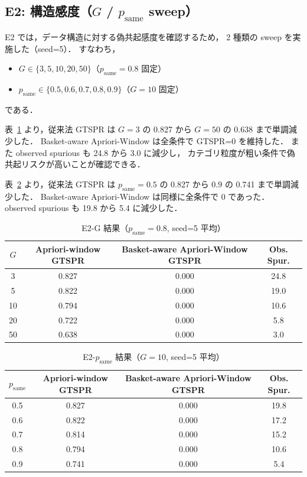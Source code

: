 \subsection{E2: 構造感度（$G$ / $p_{\text{same}}$ sweep）}
\label{sec:exp_e2}

E2 では，データ構造に対する偽共起感度を確認するため，
2 種類の sweep を実施した（seed=5）．
すなわち，
\begin{itemize}
    \item $G \in \{3,5,10,20,50\}$（$p_{\text{same}}=0.8$ 固定）
    \item $p_{\text{same}} \in \{0.5,0.6,0.7,0.8,0.9\}$（$G=10$ 固定）
\end{itemize}
である．

表~\ref{tab:e2_g_sweep} より，従来法 GTSPR は
$G=3$ の 0.827 から $G=50$ の 0.638 まで単調減少した．
Basket-aware Apriori-Window は全条件で GTSPR=0 を維持した．
また observed spurious も 24.8 から 3.0 に減少し，
カテゴリ粒度が粗い条件で偽共起リスクが高いことが確認できる．

表~\ref{tab:e2_psame_sweep} より，従来法 GTSPR は
$p_{\text{same}}=0.5$ の 0.827 から $0.9$ の 0.741 まで単調減少した．
Basket-aware Apriori-Window は同様に全条件で 0 であった．
observed spurious も 19.8 から 5.4 に減少した．

\begin{table}[t]
\caption{E2-G 結果（$p_{\text{same}}=0.8$, seed=5 平均）}
\label{tab:e2_g_sweep}
\centering
\begin{tabular}{cccc}
\toprule
$G$ & Apriori-window GTSPR & Basket-aware Apriori-Window GTSPR & Obs. Spur. \\
\midrule
3  & 0.827 & 0.000 & 24.8 \\
5  & 0.822 & 0.000 & 19.0 \\
10 & 0.794 & 0.000 & 10.6 \\
20 & 0.722 & 0.000 & 5.8 \\
50 & 0.638 & 0.000 & 3.0 \\
\bottomrule
\end{tabular}
\end{table}

\begin{table}[t]
\caption{E2-$p_{\text{same}}$ 結果（$G=10$, seed=5 平均）}
\label{tab:e2_psame_sweep}
\centering
\begin{tabular}{cccc}
\toprule
$p_{\text{same}}$ & Apriori-window GTSPR & Basket-aware Apriori-Window GTSPR & Obs. Spur. \\
\midrule
0.5 & 0.827 & 0.000 & 19.8 \\
0.6 & 0.822 & 0.000 & 17.2 \\
0.7 & 0.814 & 0.000 & 15.2 \\
0.8 & 0.794 & 0.000 & 10.6 \\
0.9 & 0.741 & 0.000 & 5.4 \\
\bottomrule
\end{tabular}
\end{table}

